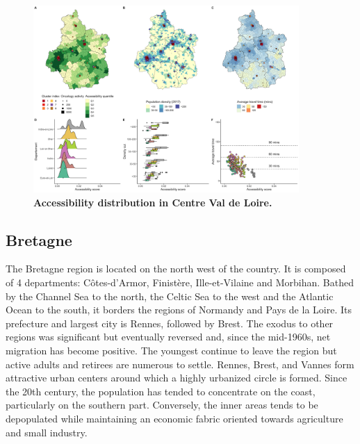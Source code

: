\begin{figure}[H]
    \includegraphics[width=0.9\textwidth]{images/camion/region_accessibility/accessibility_Centre-Val-de-Loire.png}
    \centering
    \caption{
        \textbf{Accessibility distribution in Centre Val de Loire.}
    }
\end{figure}

\subsection*{Bretagne}

The Bretagne region is located on the north west of the country. It is composed of 4 departments: Côtes-d'Armor, Finistère, Ille-et-Vilaine and Morbihan. Bathed by the Channel Sea to the north, the Celtic Sea to the west and the Atlantic Ocean to the south, it borders the regions of Normandy and Pays de la Loire. Its prefecture and largest city is Rennes, followed by Brest.
The exodus to other regions was significant but eventually reversed and, since the mid-1960s, net migration has become positive. The youngest continue to leave the region but active adults and retirees are numerous to settle. Rennes, Brest, and Vannes form attractive urban centers around which a highly urbanized circle is formed. Since the 20th century, the population has tended to concentrate on the coast, particularly on the southern part. Conversely, the inner areas tends to be depopulated while maintaining an economic fabric oriented towards agriculture and small industry.

